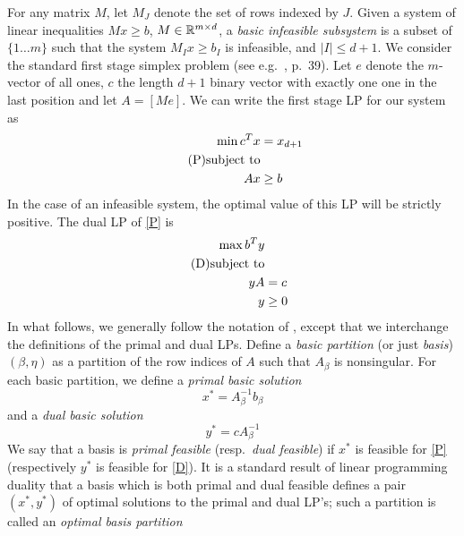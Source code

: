 \documentclass[12pt]{article}
\begin{document}
For any matrix $M$, let $M_J$ denote the set of rows indexed by $J$.
Given a system of linear inequalities $Mx \geq b$, $M \in \mathbb{R}^{m \times
  d}$, a \emph{basic infeasible subsystem} is a subset of $\{ 1 \dots
m\}$ such that the system $M_I x \geq b_I$ is infeasible, and $|I|
\leq d+1$. 
 We consider the standard first stage simplex
problem (see e.g.~\cite{chvatal80}, p.~39). Let  $e$ denote the
$m$-vector of all ones, $c$ the length $d+1$ binary vector with
exactly one one in the last position and let $A=[M e]$. We can write the first stage LP for our system as
\begin{align*}
    \min c^Tx &= x_{d+1}\\\tag{P}\eqlabel{P}
    \text{subject to}\\
    Ax &\geq b
\end{align*}
  In the case of an
infeasible system, the optimal value of this LP will be strictly
positive. 
The dual LP of \eqref{P} is
\begin{align*}
  \max b^T y\\\tag{D}
  \eqlabel{D}
  \text{subject to}\\
  yA &= c\\
  y & \geq 0
\end{align*}
In what follows, we generally follow the notation of \cite{megiddo91},
except that we interchange the definitions of the primal and dual LPs.
Define a \emph{basic partition} (or just \emph{basis}) $(\beta,\eta)$
as a partition of the row indices of $A$ such that $A_\beta$ is
nonsingular.  For each basic partition, we define a \emph{primal basic
  solution}
\begin{equation*}
  x^*=A_\beta^{-1} b_\beta
\end{equation*}
and a \emph{dual basic solution}
\begin{equation*}
  y^*= c A^{-1}_\beta
\end{equation*}
We say that a basis is \emph{primal feasible} (resp.\ \emph{dual
  feasible}) if $x^*$ is feasible for \eqref{P} (respectively $y^*$
is feasible for \eqref{D}).  It is a standard result of linear
programming duality that a basis which is both primal and dual feasible
defines a pair $(x^*,y^*)$ of optimal solutions to the primal and dual
LP's; such a partition is called an \emph{optimal basis partition}
\end{document}

